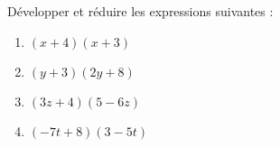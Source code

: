 
\begin{exercice}\label{exo2smath-0109}

Développer et réduire les expressions suivantes :
\begin{multicols}{2}
    \begin{enumerate}
        \item
$ (x + 4)(x + 3)$
\item
$ (y + 3)(2y + 8)$
\item
$ (3z + 4)(5 -6z)$
\item
 $  (- 7t + 8)(3 - 5t)$
    \end{enumerate}
\end{multicols}


\end{exercice}
